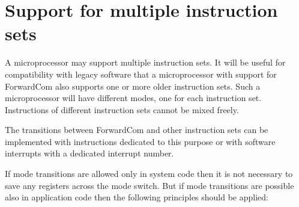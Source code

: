 \documentclass[forwardcom.tex]{subfiles}
\begin{document}
\RaggedRight

\chapter{Support for multiple instruction sets}

A microprocessor may support multiple instruction sets. It will be useful for compatibility with legacy software that a microprocessor with support for ForwardCom also supports one or more older instruction sets. Such a microprocessor will have different modes, one for each instruction set. Instructions of different instruction sets cannot be mixed freely.
\vspace{2mm}

The transitions between ForwardCom and other instruction sets can be implemented with instructions dedicated to this purpose or with software interrupts with a dedicated interrupt number. 
\vspace{2mm}

If mode transitions are allowed only in system code then it is not necessary to save any registers across the mode switch. But if mode transitions are possible also in application code then the following principles should be applied:
\end{document}
